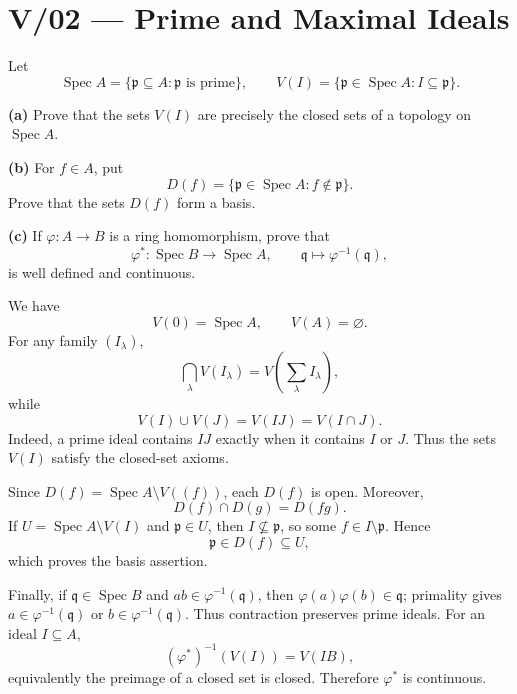 \section*{V/02 --- Prime and Maximal Ideals}

\begin{problem}[CP-V-0002]
\label{prob:cp-v-0002}
Let
\[
\operatorname{Spec}A=\{\mathfrak p\subseteq A:\mathfrak p\text{ is prime}\},
\qquad
V(I)=\{\mathfrak p\in\operatorname{Spec}A:I\subseteq\mathfrak p\}.
\]

\textbf{(a)} Prove that the sets \(V(I)\) are precisely the closed sets of a topology
on \(\operatorname{Spec}A\).

\textbf{(b)} For \(f\in A\), put
\[
D(f)=\{\mathfrak p\in\operatorname{Spec}A:f\notin\mathfrak p\}.
\]
Prove that the sets \(D(f)\) form a basis.

\textbf{(c)} If \(\varphi:A\to B\) is a ring homomorphism, prove that
\[
\varphi^*:\operatorname{Spec}B\longrightarrow\operatorname{Spec}A,
\qquad
\mathfrak q\longmapsto\varphi^{-1}(\mathfrak q),
\]
is well defined and continuous.
\end{problem}

\begin{solution}
We have
\[
V(0)=\operatorname{Spec}A,\qquad V(A)=\varnothing.
\]
For any family \((I_\lambda)\),
\[
\bigcap_\lambda V(I_\lambda)=V\!\left(\sum_\lambda I_\lambda\right),
\]
while
\[
V(I)\cup V(J)=V(IJ)=V(I\cap J).
\]
Indeed, a prime ideal contains \(IJ\) exactly when it contains \(I\) or \(J\).
Thus the sets \(V(I)\) satisfy the closed-set axioms.

Since \(D(f)=\operatorname{Spec}A\setminus V((f))\), each \(D(f)\) is open.
Moreover,
\[
D(f)\cap D(g)=D(fg).
\]
If \(U=\operatorname{Spec}A\setminus V(I)\) and \(\mathfrak p\in U\), then
\(I\nsubseteq\mathfrak p\), so some \(f\in I\setminus\mathfrak p\). Hence
\[
\mathfrak p\in D(f)\subseteq U,
\]
which proves the basis assertion.

Finally, if \(\mathfrak q\in\operatorname{Spec}B\) and
\(ab\in\varphi^{-1}(\mathfrak q)\), then
\(\varphi(a)\varphi(b)\in\mathfrak q\); primality gives
\(a\in\varphi^{-1}(\mathfrak q)\) or \(b\in\varphi^{-1}(\mathfrak q)\).
Thus contraction preserves prime ideals. For an ideal \(I\subseteq A\),
\[
(\varphi^*)^{-1}(V(I))
=
V(IB),
\]
equivalently the preimage of a closed set is closed. Therefore \(\varphi^*\)
is continuous.
\end{solution}


